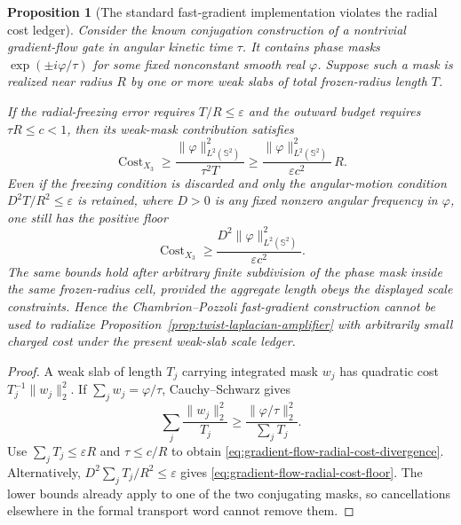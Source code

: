 \documentclass[11pt]{article}
\newtheorem{proposition}[theorem]{Proposition}
\theoremstyle{remark}
\begin{document}
\begin{proposition}[The standard fast-gradient implementation violates the
radial cost ledger]
\label{prop:gradient-flow-radial-cost-no-go}
Consider the known conjugation construction of a nontrivial gradient-flow
gate in angular kinetic time $\tau$.  It contains phase masks
$\exp(\pm i\varphi/\tau)$ for some fixed nonconstant smooth real
$\varphi$.  Suppose such a mask is realized near radius $R$ by one or more
weak slabs of total frozen-radius length $T$.

If the radial-freezing error requires $T/R\leq\varepsilon$ and the outward
budget requires $\tau R\leq c<1$, then its weak-mask contribution satisfies
\begin{equation}
 \operatorname{Cost}_{X_3}
 \geq
 \frac{\|\varphi\|_{L^2(\mathbb S^2)}^2}{\tau^2T}
 \geq
 \frac{\|\varphi\|_{L^2(\mathbb S^2)}^2}{\varepsilon c^2}\,R.
 \label{eq:gradient-flow-radial-cost-divergence}
\end{equation}
Even if the freezing condition is discarded and only the angular-motion
condition $D^2T/R^2\leq\varepsilon$ is retained, where $D>0$ is any fixed
nonzero angular frequency in $\varphi$, one still has the positive floor
\begin{equation}
 \operatorname{Cost}_{X_3}
 \geq
 \frac{D^2\|\varphi\|_{L^2(\mathbb S^2)}^2}
 {\varepsilon c^2}.
 \label{eq:gradient-flow-radial-cost-floor}
\end{equation}
The same bounds hold after arbitrary finite subdivision of the phase mask
inside the same frozen-radius cell, provided the aggregate length obeys the
displayed scale constraints.
Hence the Chambrion--Pozzoli fast-gradient construction cannot be used to
radialize Proposition~\ref{prop:twist-laplacian-amplifier} with arbitrarily
small charged cost under the present weak-slab scale ledger.
\end{proposition}

\begin{proof}
A weak slab of length $T_j$ carrying integrated mask $w_j$ has quadratic
cost $T_j^{-1}\|w_j\|_2^2$.  If $\sum_jw_j=\varphi/\tau$, Cauchy--Schwarz
gives
\[
 \sum_j\frac{\|w_j\|_2^2}{T_j}
 \geq
 \frac{\|\varphi/\tau\|_2^2}{\sum_jT_j}.
\]
Use $\sum_jT_j\leq\varepsilon R$ and
$\tau\leq c/R$ to obtain
\eqref{eq:gradient-flow-radial-cost-divergence}.  Alternatively,
$D^2\sum_jT_j/R^2\leq\varepsilon$ gives
\eqref{eq:gradient-flow-radial-cost-floor}.  The lower bounds already apply
to one of the two conjugating masks, so cancellations elsewhere in the
formal transport word cannot remove them.
\end{proof}
\end{document}
